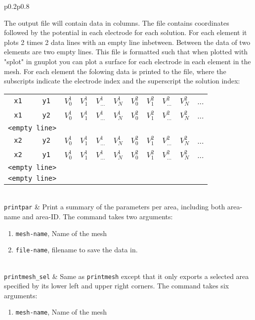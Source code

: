 \documentclass[noshowpacs,preprintnumbers,amsmath,amssymb, letter]{revtex4}
\begin{document}
\begin{longtable}{p{}p{}}
\begin{enumerate}
\end{enumerate}
The output file will contain data in columns. The file contains coordinates followed by the potential in each electrode for each solution. For each element it plots 2 times 2 data lines with an empty line inbetween. Between the data of two elements are two empty lines. This file is formatted such that when plotted with "splot" in gnuplot you can plot a surface for each electrode in each element in the mesh. For each element the folowing data is printed to the file, where the subscripts indicate the electrode index and the superscript the solution index:\newline 
\begin{tabular}{ccccccccccc}
	\texttt{x1} & \texttt{y1} & $V_0^1$ & $V_1^1$ & $V_{...}^1$ & $V_N^1$ & $V_0^2$ & $V_1^2$ & $V_{...}^2$ & $V_N^2$& ...\\
	\texttt{x1} & \texttt{y2} & $V_0^1$ & $V_1^1$ & $V_{...}^1$ & $V_N^1$ & $V_0^2$ & $V_1^2$ & $V_{...}^2$ & $V_N^2$& ...\\
	\multicolumn{2}{l}{\texttt{<empty line>}}\\
	\texttt{x2} & \texttt{y2} & $V_0^1$ & $V_1^1$ & $V_{...}^1$ & $V_N^1$ & $V_0^2$ & $V_1^2$ & $V_{...}^2$ & $V_N^2$& ...\\
	\texttt{x2} & \texttt{y1} & $V_0^1$ & $V_1^1$ & $V_{...}^1$ & $V_N^1$ & $V_0^2$ & $V_1^2$ & $V_{...}^2$ & $V_N^2$& ...\\
	\multicolumn{2}{l}{\texttt{<empty line>}}\\
	\multicolumn{2}{l}{\texttt{<empty line>}}\\
\end{tabular}\\
\texttt{printpar}	& Print a summary of the parameters per area, including both area-name and area-ID. The command takes two arguments:
\begin{enumerate}
\item \texttt{mesh-name}, Name of the mesh
\item \texttt{file-name}, filename to save the data in.
\end{enumerate}\\
\texttt{printmesh\_sel}	& Same as \texttt{printmesh} except that it only exports a selected area specified by its lower left and upper right corners. The command takes six arguments:
\begin{enumerate}
\item \texttt{mesh-name}, Name of the mesh

\end{enumerate}
\end{longtable}
\end{document}
